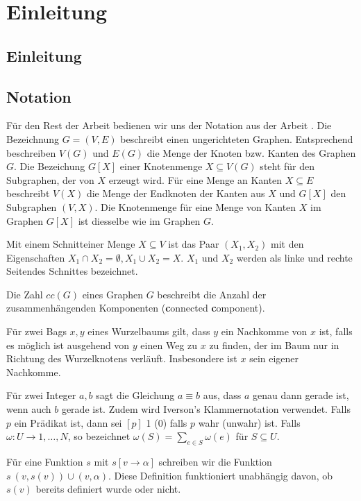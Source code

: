 \chapter{Einleitung}
\label{c:intro} %

\section{Einleitung}
\label{sec:intro_overv}

\section{Notation}
\label{sec:intro_not}
Für den Rest der Arbeit bedienen wir uns der Notation aus der Arbeit \cite{cygan_solving_2011}. Die Bezeichnung $G=(V,E)$ beschreibt einen ungerichteten Graphen. Entsprechend beschreiben $V(G)$ und $E(G)$ die Menge der Knoten bzw. Kanten des Graphen $G$. Die Bezeichung $G[X]$ einer Knotenmenge $X \subseteq V(G)$ steht für den Subgraphen, der von $X$ erzeugt wird. Für eine Menge an Kanten $X \subseteq E$ beschreibt $V(X)$ die Menge der Endknoten der Kanten aus $X$ und $G[X]$ den Subgraphen $(V,X)$. Die Knotenmenge für eine Menge von Kanten $X$ im Graphen $G[X]$ ist diesselbe wie im Graphen $G$.

Mit einem \glqq Schnitt\grqq einer Menge $X \subseteq V$ ist das Paar $(X_1,X_2)$ mit den Eigenschaften $X_1 \cap X_2 = \emptyset,X_1 \cup X_2 = X$. $X_1$ und $X_2$ werden als linke und rechte \glqq Seiten\grqq des Schnittes bezeichnet.

Die Zahl $cc(G)$ eines Graphen $G$ beschreibt die Anzahl der zusammenhängenden Komponenten (\glqq \textbf{c}onnected \textbf{c}omponent\grqq).

Für zwei Bags $x,y$ eines Wurzelbaums gilt, dass $y$ ein Nachkomme von $x$ ist, falls es möglich ist ausgehend von $y$ einen Weg zu $x$ zu finden, der im Baum nur in Richtung des Wurzelknotens verläuft. Insbesondere ist $x$ sein eigener Nachkomme.

Für zwei Integer $a,b$ sagt die Gleichung $a \equiv b$ aus, dass $a$ genau dann gerade ist, wenn auch $b$ gerade ist.
Zudem wird Iverson's Klammernotation verwendet. Falls $p$ ein Prädikat ist, dann sei $[p]$ 1 (0) falls $p$ wahr (unwahr) ist.
Falls $\omega:U\rightarrow {1,\dots,N}$, so bezeichnet $\omega(S)=\sum_{e\in S} \omega(e)$ für $S \subseteq U$.

Für eine Funktion $s$ mit $s[v \rightarrow \alpha]$ schreiben wir die Funktion $s \ {(v,s(v))}\cup{(v,\alpha)}$. Diese Definition funktioniert unabhängig davon, ob $s(v)$ bereits definiert wurde oder nicht.
